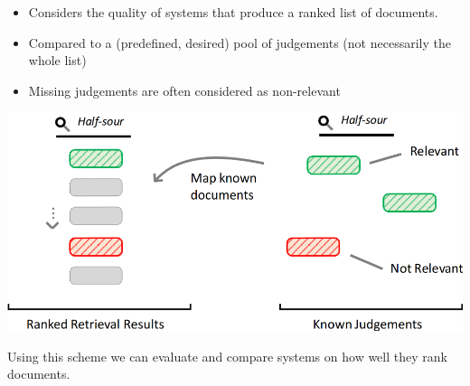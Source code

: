 \documentclass[
../../NLP4W_Summary.tex,
]
{subfiles}
\begin{document}
\begin{defbox}
    \begin{itemize}
        \item Considers the quality of systems that produce a ranked list of documents.
        \item Compared to a (predefined, desired) pool of judgements (not necessarily the whole list)
        \item Missing judgements are often considered as non-relevant
    \end{itemize}
    \begin{center}
        \includegraphics[scale=0.5]{Pics/ExtrinsicEvaluationScheme.png}
    \end{center}
    Using this scheme we can evaluate and compare systems on how well they rank documents.
\end{defbox}
\end{document}
